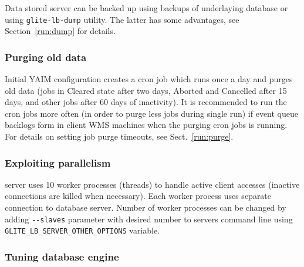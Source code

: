 Data stored \LB server can be backed up using backups of underlaying database or using \verb'glite-lb-dump' utility.
The latter has some advantages, see Section~\ref{run:dump} for details.

\subsubsection{Purging old data}
\label{inst:purge}

Initial YAIM configuration creates a cron job which runs once a day and purges old 
data (jobs in Cleared state after two days, Aborted and Cancelled after 15 days, and other jobs 
after 60 days of inactivity). It is recommended to run the cron jobs more often (in order to purge less jobs
during single run) if event queue backlogs form in client WMS machines when the purging cron jobs is running.
For details on setting job purge timeouts, see Sect.~\ref{run:purge}.


\subsubsection{Exploiting parallelism}

\LB server uses 10 worker processes (threads) to handle active client accesses (inactive connections are killed
when necessary). Each worker process uses separate connection to database server. Number of worker processes 
can be changed by adding \verb'--slaves' parameter with desired number to servers command line
using \verb'GLITE_LB_SERVER_OTHER_OPTIONS' variable.

\subsubsection{Tuning database engine}
\label{inst:db_tuning}

